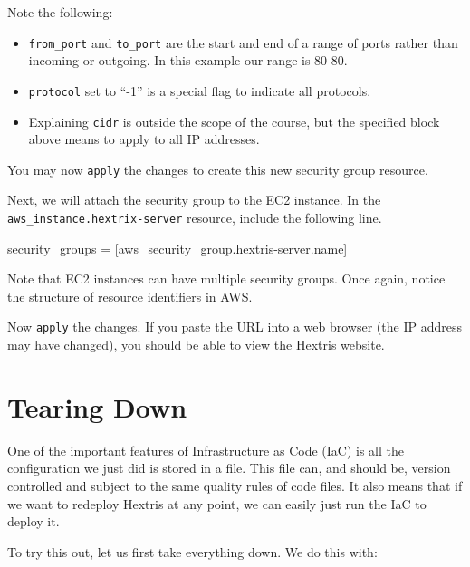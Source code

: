 \documentclass{csse4400}
\begin{document}
\begin{minipage}{\textwidth}
Note the following:
\begin{itemize}
  \item \texttt{from\_port} and \texttt{to\_port} are the start and end of a range of ports rather than incoming or outgoing. In this example our range is 80-80.
  \item \texttt{protocol} set to ``-1'' is a special flag to indicate all protocols.
  \item Explaining \texttt{cidr} is outside the scope of the course, but the specified block above means to apply to all IP addresses.
\end{itemize}
\end{minipage}

\vspace{1em}
You may now \texttt{apply} the changes to create this new security group resource.

Next, we will attach the security group to the EC2 instance.
In the \texttt{aws\_instance.hextrix-server} resource, include the following line.

\begin{code}[language=terraform,numbers=none]{}
security_groups = [aws_security_group.hextris-server.name]
\end{code}

Note that EC2 instances can have multiple security groups.
Once again, notice the structure of resource identifiers in AWS.


Now \texttt{apply} the changes.
If you paste the URL into a web browser (the IP address may have changed),
you should be able to view the Hextris website.


\section{Tearing Down}

One of the important features of Infrastructure as Code (IaC) is all the configuration we just did is stored in a file.
This file can, and should be, version controlled and subject to the same quality rules of code files.
It also means that if we want to redeploy Hextris at any point,
we can easily just run the IaC to deploy it.

To try this out, let us first take everything down.
We do this with:
\end{document}
